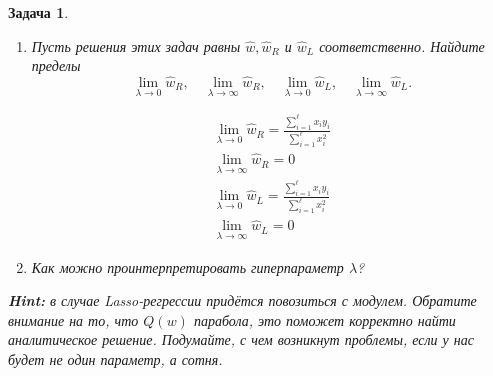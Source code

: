 \documentclass[12pt,fleqn]{article}
\newtheorem{esProblem}{Задача}
\begin{document}
\begin{esProblem}
\begin{enumerate}
    
    \item Пусть решения этих задач равны $\hat{w}, \hat{w}_R$ и $\hat{w}_L$ соответственно. Найдите пределы 
        \begin{equation*} 
            \lim_{\lambda \to 0}  \hat{w}_R, \quad \lim_{\lambda \to \infty}  \hat{w}_R, \quad \lim_{\lambda \to 0}  \hat{w}_L, \quad \lim_{\lambda \to \infty}  \hat{w}_L.
        \end{equation*} 
        
        \begin{gather*}
        \lim_{\lambda \to 0} \hat{w}_R = \frac{\sum_{i=1}^\ell x_i y_i}{\sum_{i=1}^\ell x_i^2} \\
        	\lim_{\lambda \to \infty} \hat{w}_R = 0 \\
         	\lim_{\lambda \to 0} \hat{w}_L = \frac{\sum_{i=1}^{\ell} x_i y_i}{\sum_{i=1}^{\ell} x_i^2} \\
        	\lim_{\lambda \to \infty}  \hat{w}_L = 0
        \end{gather*} 
    \item Как можно проинтерпретировать гиперпараметр $\lambda$? 
\end{enumerate}

\textbf{Hint:} в случае Lasso-регрессии придётся повозиться с модулем. Обратите внимание на то, что $Q(w)$ парабола, это поможет корректно найти аналитическое решение. Подумайте, с чем возникнут проблемы, если у нас будет не один параметр, а сотня. 
\end{esProblem}
\end{document}
